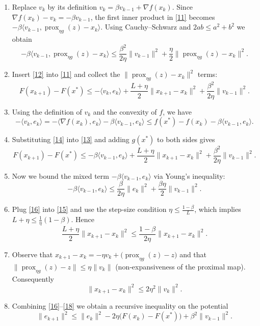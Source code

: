 \documentclass{article}
\newcommand{\prox}{\operatorname{prox}}
\begin{document}
\begin{enumerate}[label=[Step \arabic*], leftmargin=*]
\item Replace $v_{k}$ by its definition $v_{k}= \beta v_{k-1}+ \nabla f(x_{k})$.
Since $\nabla f(x_{k})-v_{k}= -\beta v_{k-1}$, the first inner product in \eqref{11} becomes $-\beta\langle v_{k-1},\prox_{\eta g}(z)-x_{k}\rangle$.
Using Cauchy–Schwarz and $2ab\le a^{2}+b^{2}$ we obtain
\[
-\beta\langle v_{k-1},\prox_{\eta g}(z)-x_{k}\rangle
\le \frac{\beta^{2}}{2\eta}\|v_{k-1}\|^{2}+\frac{\eta}{2}\|\prox_{\eta g}(z)-x_{k}\|^{2}.
\tag{12}
\]

\item Insert \eqref{12} into \eqref{11} and collect the $\|\prox_{\eta g}(z)-x_{k}\|^{2}$ terms:
\[
F(x_{k+1})-F(x^{*})
\le -\langle v_{k},e_{k}\rangle
+\frac{L+\eta}{2}\|x_{k+1}-x_{k}\|^{2}
+\frac{\beta^{2}}{2\eta}\|v_{k-1}\|^{2}.
\tag{13}
\]

\item Using the definition of $v_{k}$ and the convexity of $f$, we have
\[
-\langle v_{k},e_{k}\rangle
= -\langle \nabla f(x_{k}),e_{k}\rangle -\beta\langle v_{k-1},e_{k}\rangle
\le f(x^{*})-f(x_{k}) -\beta\langle v_{k-1},e_{k}\rangle .
\tag{14}
\]

\item Substituting \eqref{14} into \eqref{13} and adding $g(x^{*})$ to both sides gives
\[
F(x_{k+1})-F(x^{*})
\le -\beta\langle v_{k-1},e_{k}\rangle
+\frac{L+\eta}{2}\|x_{k+1}-x_{k}\|^{2}
+\frac{\beta^{2}}{2\eta}\|v_{k-1}\|^{2}.
\tag{15}
\]

\item Now we bound the mixed term $-\beta\langle v_{k-1},e_{k}\rangle$ via Young’s inequality:
\[
-\beta\langle v_{k-1},e_{k}\rangle
\le \frac{\beta}{2\eta}\|e_{k}\|^{2}+ \frac{\beta\eta}{2}\|v_{k-1}\|^{2}.
\tag{16}
\]

\item Plug \eqref{16} into \eqref{15} and use the step‑size condition $\eta\le\frac{1-\beta}{L}$, which implies $L+\eta\le \frac{1}{\eta}(1-\beta)$. Hence
\[
\frac{L+\eta}{2}\|x_{k+1}-x_{k}\|^{2}
\le \frac{1-\beta}{2\eta}\|x_{k+1}-x_{k}\|^{2}.
\tag{17}
\]

\item Observe that $x_{k+1}-x_{k}= -\eta v_{k}+ \bigl(\prox_{\eta g}(z)-z\bigr)$ and that $\|\prox_{\eta g}(z)-z\|\le\eta\|v_{k}\|$ (non‑expansiveness of the proximal map). Consequently
\[
\|x_{k+1}-x_{k}\|^{2}\le 2\eta^{2}\|v_{k}\|^{2}.
\tag{18}
\]

\item Combining \eqref{16}–\eqref{18} we obtain a recursive inequality on the potential
\[
\|e_{k+1}\|^{2}
\le \|e_{k}\|^{2}
-2\eta\bigl(F(x_{k})-F(x^{*})\bigr)
+ \beta^{2}\|v_{k-1}\|^{2}.
\tag{19}
\]


\end{enumerate}
\end{document}
